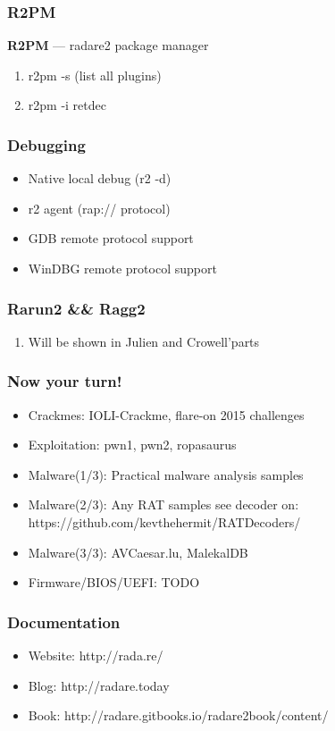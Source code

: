 \documentclass[10pt,pdf,utf8,english,compress,hyperref={unicode}]{beamer}
\begin{document}
\begin{frame}[fragile]
  \frametitle{R2PM}
	\center\textbf{R2PM} — radare2 package manager
  \noindent\makebox[\linewidth]{\rule{\paperwidth}{0.4pt}}
  \begin{enumerate}
  \item r2pm -s (list all plugins)
	\item r2pm -i retdec
 \end{enumerate}
\end{frame}
\begin{frame}[fragile]
  \frametitle{Debugging}
  \begin{itemize}
	\item Native local debug (r2 -d)
	\item r2 agent (rap:// protocol)
	\item GDB remote protocol support
	\item WinDBG remote protocol support
  \end{itemize}
\end{frame}

\begin{frame}[fragile]
  \frametitle{Rarun2 \&\& Ragg2}
  \noindent\makebox[\linewidth]{\rule{\paperwidth}{0.4pt}}
  \begin{enumerate}
  \item Will be shown in Julien and Crowell'parts
 \end{enumerate}
\end{frame}

\begin{frame}[fragile]
  \frametitle{Now your turn!}
    \begin{itemize}
    \item \alert{Crackmes:} IOLI-Crackme, flare-on 2015 challenges
    \item \alert{Exploitation:} pwn1, pwn2, ropasaurus
    \item \alert{Malware(1/3):} Practical malware analysis samples
    \item \alert{Malware(2/3):} Any RAT samples see decoder on: https://github.com/kevthehermit/RATDecoders/
    \item \alert{Malware(3/3):} AVCaesar.lu, MalekalDB
    \item \alert{Firmware/BIOS/UEFI:} TODO
    \end{itemize}
\end{frame}

\begin{frame}[fragile]
  \frametitle{Documentation}
    \begin{itemize}
    \item \alert{Website:} http://rada.re/
    \item \alert{Blog:} http://radare.today
    \item \alert{Book:} http://radare.gitbooks.io/radare2book/content/
    \end{itemize}
\end{frame}
\end{document}
